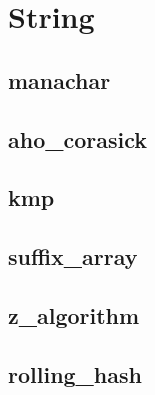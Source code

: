 \section{String}

\subsection{manachar}


\subsection{aho_corasick}


\subsection{kmp}


\subsection{suffix_array}


\subsection{z_algorithm}


\subsection{rolling_hash}

